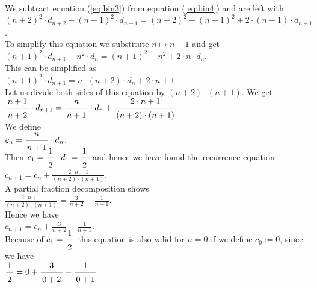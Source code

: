 We subtract equation  (\ref{eq:bin3}) from equation (\ref{eq:bin4})
and are left with \\[0.2cm]
\hspace*{1.3cm} 
$(n+2)^2 \cdot d_{n+2} - (n+1)^2 \cdot d_{n+1} = (n+2)^2 - (n+1)^2 + 2 \cdot (n+1) \cdot d_{n+1}$.
\\[0.2cm]
To simplify this equation we substitute  $n \mapsto n - 1$ and get \\[0.2cm]
\hspace*{1.3cm} 
$(n+1)^2 \cdot d_{n+1} - n^2 \cdot d_{n} = (n+1)^2 - n^2 + 2 \cdot n \cdot d_{n}$.
\\[0.2cm]
This can be simplified as \\[0.2cm]
\hspace*{1.3cm} $(n+1)^2 \cdot d_{n+1}  =  n \cdot (n + 2) \cdot d_{n} + 2 \cdot n + 1$. \\[0.2cm]
Let us divide both sides of this equation by $(n+2)\cdot (n+1)$.  We get \\[0.2cm]
\hspace*{1.3cm}  
$\displaystyle \bruch{n+1}{n+2} \cdot d_{n+1}  =  \bruch{n}{n + 1} \cdot d_{n} + \bruch{2 \cdot n + 1}{(n+2)\cdot (n+1)}$. \\[0.2cm]
We define \\[0.2cm]
\hspace*{1.3cm} $\displaystyle c_n = \bruch{n}{n+1} \cdot d_n$. \\[0.4cm]
Then $c_1 = \bruch{1}{2} \cdot d_1 = \bruch{1}{2}$ and hence we have found the recurrence equation \\[0.2cm]
\hspace*{1.3cm} 
$\displaystyle c_{n+1}  =  c_{n} + \frac{2 \cdot n + 1}{(n+2)\cdot (n+1)}$. \\[0.2cm]
A partial fraction decomposition shows \\[0.2cm]
\hspace*{1.3cm} 
$\displaystyle \frac{2 \cdot n + 1}{(n+2)\cdot (n+1)} = \frac{3}{n+2} - \frac{1}{n+1}$. \\[0.2cm]
Hence we have \\[0.2cm]
\hspace*{1.3cm} $\displaystyle c_{n+1} = c_n +  \frac{3}{n+2} - \frac{1}{n+1}$. \\[0.2cm]
Because of $c_1 = \bruch{1}{2}$ this equation is also valid for  $n=0$ if we define $c_0 := 0$, since
we have
\\[0.2cm]
\hspace*{1.3cm}
$\bruch{1}{2} = 0 + \bruch{3}{0+2} - \bruch{1}{0+1}$.
\\[0.2cm]
